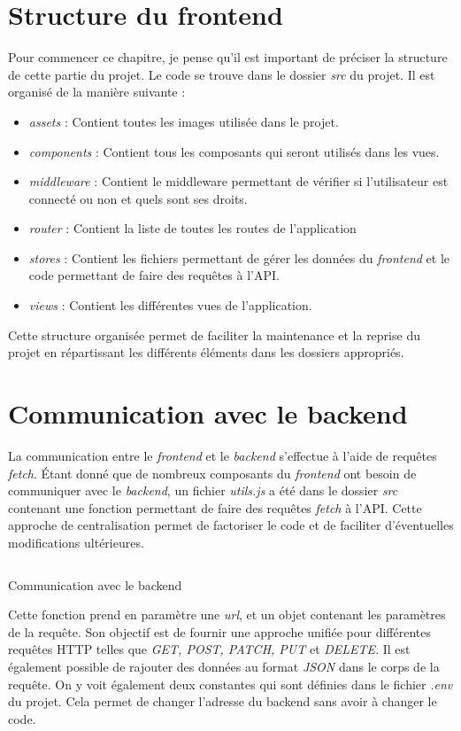 \section{Structure du frontend}
Pour commencer ce chapitre, je pense qu'il est important de préciser la structure de cette partie du projet. Le code se trouve dans le dossier \emph{src} du projet.
Il est organisé de la manière suivante :
\begin{itemize}
    \item \emph{assets} : Contient toutes les images utilisée dans le projet.
    \item \emph{components} : Contient tous les composants qui seront utilisés dans les vues.
    \item \emph{middleware} : Contient le middleware permettant de vérifier si l'utilisateur est connecté ou non et quels sont ses droits.
    \item \emph{router} : Contient la liste de toutes les routes de l'application
    \item \emph{stores} : Contient les fichiers permettant de gérer les données du \emph{frontend} et le code permettant de faire des requêtes à l'API.
    \item \emph{views} : Contient les différentes vues de l'application.
\end{itemize}

Cette structure organisée permet de faciliter la maintenance et la reprise du projet en répartissant les différents éléments dans les dossiers appropriés.

\section{Communication avec le backend}
La communication entre le \emph{frontend} et le \emph{backend} s'effectue à l'aide de requêtes \emph{fetch}. Étant donné que de nombreux composants du \emph{frontend} ont besoin de communiquer avec le \emph{backend}, un fichier \emph{utils.js} a été dans le dossier \emph{src} contenant une fonction permettant de faire des requêtes \emph{fetch} à l'API. Cette approche de centralisation permet de factoriser le code et de faciliter d'éventuelles modifications ultérieures.


\begin{listing}[H]
    \inputminted{js}{assets/code/communcation.vue}
    \caption{Communication avec le backend}
\end{listing}

Cette fonction prend en paramètre une \emph{url}, et un objet contenant les paramètres de la requête. Son objectif est de fournir une approche unifiée pour différentes requêtes HTTP telles que \emph{GET, POST, PATCH, PUT} et \emph{DELETE}. Il est également possible de rajouter des données au format \emph{JSON} dans le corps de la requête. On y voit également deux constantes qui sont définies dans le fichier \emph{.env} du projet. Cela permet de changer l'adresse du backend sans avoir à changer le code.

